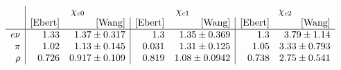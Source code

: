 $$
\begin{array}{r|rr|rr|rr}
  &\multicolumn{2}{c}{\chi_{c0}} & \multicolumn{2}{c}{\chi_{c1}} & \multicolumn{2}{c}{\chi_{c2}} \\
   & \text{[Ebert]} & \text{[Wang]} & \text{[Ebert]} & \text{[Wang]} & \text{[Ebert]} & \text{[Wang]} \\
\hline
 e\nu & 1.33 & 1.37\pm 0.317 & 1.3 & 1.35\pm 0.369 & 1.3 & 3.79\pm 1.14 \\
 \pi & 1.02 & 1.13\pm 0.145 & 0.031 & 1.31\pm 0.125 & 1.05 & 3.33\pm 0.793 \\
 \rho & 0.726 & 0.917\pm 0.109 & 0.819 & 1.08\pm 0.0942 & 0.738 & 2.75\pm 0.541 \\
\end{array}
$$